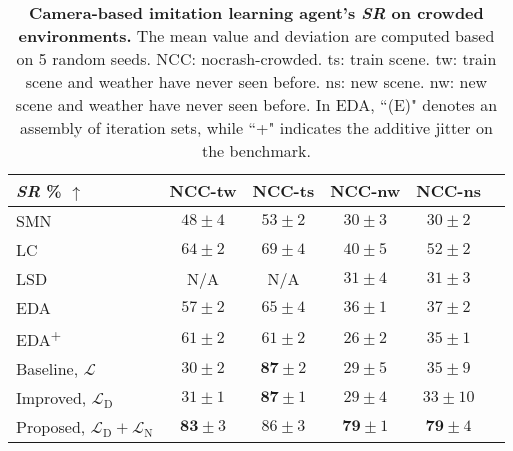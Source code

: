 \begin{table}
	\caption{\textbf{Camera-based imitation learning agent's \emph{SR} on crowded environments.}
		The mean value and deviation are computed based on 5 random seeds. 
		NCC: nocrash-crowded. ts: train scene. tw: train scene and weather have never seen before. ns: new scene. nw: new scene and weather have never seen before.
		In EDA, ``(E)" denotes an assembly of iteration sets, while ``+" indicates the additive jitter on the benchmark.}
	\setlength{\tabcolsep}{6.67pt}
	\centering
	\begin{tabular}{lccccc}
		\hline
		\emph{SR} \% $\uparrow$
		& NCC-tw  & NCC-ts   & NCC-nw  & NCC-ns  \\ 
		\hline
		SMN \cite{zhao2021sam} & 
		$48 \pm 4$ & $53 \pm 2$  & $30 \pm 3$ & $30 \pm 2$  \\
		LC \cite{chen2020learning} & 
		$64 \pm 2$ & $69 \pm 4$  & $40 \pm 5$ & $52 \pm 2$  \\
		LSD \cite{ohn2020learning} & 
		N/A & N/A & $31 \pm 4$ & $31 \pm 3$  \\
		EDA \cite{prakash2020exploring} & 
		$57 \pm 2$ & $65 \pm 4$  & $36 \pm 1$ & $37 \pm 2$  \\
		EDA\textsuperscript{+} \cite{prakash2020exploring}  & 
		$61 \pm 2$ & $61 \pm 2$  & $26 \pm 2$ & $35 \pm 1$  \\
		Baseline, $\mathcal{L}$ & 
		$30 \pm 2$ & $\mathbf{87} \pm 2$  & $29 \pm 5$ & $35 \pm 9$  \\
		Improved, $\mathcal{L}_\text{D} $ & 
		$31 \pm 1$ & $\mathbf{87} \pm 1$  & $29 \pm 4$ & $33 \pm 10$  \\
		Proposed, $\mathcal{L}_\text{D}+\mathcal{L}_\text{N}$ & 
		$\mathbf{83} \pm 3$ & $86 \pm 3$  & $\mathbf{79} \pm 1$ & $\mathbf{79} \pm 4$  \\
		\hline
	\end{tabular}
	\vspace{-1ex}
	\label{table:sucess_rate_nc_dense}
	\vspace{-2ex}
\end{table}

